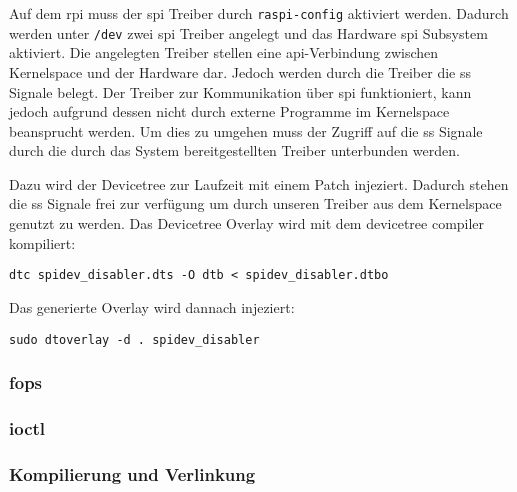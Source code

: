 

Auf dem \gls{rpi} muss der \gls{spi} Treiber durch \texttt{raspi-config} aktiviert werden.
Dadurch werden unter \texttt{/dev} zwei \gls{spi} Treiber angelegt und das Hardware \gls{spi} Subsystem aktiviert.
Die angelegten Treiber stellen eine \gls{api}-Verbindung zwischen Kernelspace und der Hardware dar.
Jedoch werden durch die Treiber die \gls{ss} Signale belegt.
Der Treiber zur Kommunikation über \gls{spi} funktioniert, kann jedoch aufgrund dessen nicht durch externe Programme im Kernelspace beansprucht werden.
Um dies zu umgehen muss der Zugriff auf die \gls{ss} Signale durch die durch das System bereitgestellten Treiber unterbunden werden.

Dazu wird der Devicetree zur Laufzeit mit einem Patch injeziert.
Dadurch stehen die \gls{ss} Signale frei zur verfügung um durch unseren Treiber aus dem Kernelspace genutzt zu werden.
Das Devicetree Overlay wird mit dem devicetree compiler kompiliert:
\begin{lstlisting}
dtc spidev_disabler.dts -O dtb < spidev_disabler.dtbo
\end{lstlisting}
Das generierte Overlay wird dannach injeziert:
\begin{lstlisting}
sudo dtoverlay -d . spidev_disabler
\end{lstlisting}

\subsubsection{\acrshort{fops}}

\subsubsection{\Acrshort{ioctl}}

\subsubsection{Kompilierung und Verlinkung}
